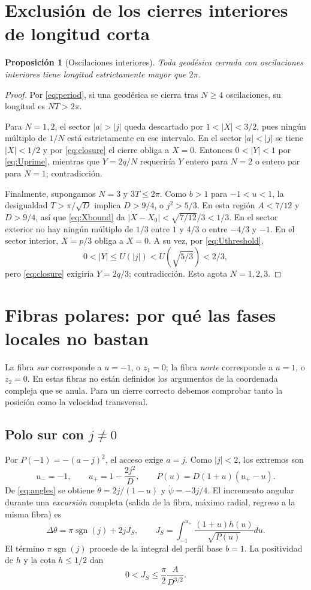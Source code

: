 \documentclass[11pt,a4paper]{article}
\newtheorem{proposition}[theorem]{Proposición}
\theoremstyle{remark}\newtheorem{remark}[theorem]{Observación}
\newcommand{\sgn}{\operatorname{sgn}}
\begin{document}
\section{Exclusión de los cierres interiores de longitud corta}
\begin{proposition}[Oscilaciones interiores]\label{prop:interior}
Toda geodésica cerrada con oscilaciones interiores tiene longitud estrictamente mayor que $2\pi$.
\end{proposition}
\begin{proof}
Por \eqref{eq:period}, si una geodésica se cierra tras $N\ge4$ oscilaciones, su longitud es $NT>2\pi$.

Para $N=1,2$, el sector $|a|>|j|$ queda descartado por $1<|X|<3/2$, pues ningún múltiplo de $1/N$ está estrictamente en ese intervalo. En el sector $|a|<|j|$ se tiene $|X|<1/2$ y por \eqref{eq:closure} el cierre obliga a $X=0$. Entonces $0<|Y|<1$ por \eqref{eq:Uprime}, mientras que $Y=2q/N$ requeriría $Y$ entero para $N=2$ o entero par para $N=1$; contradicción.

Finalmente, supongamos $N=3$ y $3T\le2\pi$. Como $b>1$ para $-1<u<1$, la desigualdad $T>\pi/\sqrt D$ implica $D>9/4$, o $j^2>5/3$. En esta región $A<7/12$ y $D>9/4$, así que \eqref{eq:Xbound} da $|X-X_0|<\sqrt{7/12}/3<1/3$. En el sector exterior no hay ningún múltiplo de $1/3$ entre $1$ y $4/3$ o entre $-4/3$ y $-1$. En el sector interior, $X=p/3$ obliga a $X=0$. A su vez, por \eqref{eq:Uthreshold},
\[
0<|Y|\le U(|j|)<U(\sqrt{5/3})<2/3,
\]
pero \eqref{eq:closure} exigiría $Y=2q/3$; contradicción. Esto agota $N=1,2,3$.
\end{proof}

\section{Fibras polares: por qué las fases locales no bastan}
La fibra \emph{sur} corresponde a $u=-1$, o $z_1=0$; la fibra \emph{norte} corresponde a $u=1$, o $z_2=0$. En estas fibras no están definidos los argumentos de la coordenada compleja que se anula. Para un cierre correcto debemos comprobar tanto la posición como la velocidad transversal.

\subsection{Polo sur con $j\ne0$}
Por $P(-1)=-(a-j)^2$, el acceso exige $a=j$. Como $|j|<2$, los extremos son
\[
u_-=-1,\qquad u_+=1-\frac{2j^2}{D},\qquad
P(u)=D(1+u)(u_+-u).
\]
De \eqref{eq:angles} se obtiene $\dot\theta=2j/(1-u)$ y $\dot\psi=-3j/4$. El incremento angular durante una \emph{excursión} completa (salida de la fibra, máximo radial, regreso a la misma fibra) es
\begin{equation}\label{eq:south}
\Delta\theta=\pi\sgn(j)+2jJ_S,\qquad
J_S=\int_{-1}^{u_+}\frac{(1+u)h(u)}{\sqrt{P(u)}}du.
\end{equation}
El término $\pi\sgn(j)$ procede de la integral del perfil base $b=1$. La positividad de $h$ y la cota $h\le1/2$ dan
\begin{equation}\label{eq:Js}
0<J_S\le\frac\pi2\frac{A}{D^{3/2}}.
\end{equation}
\end{document}
